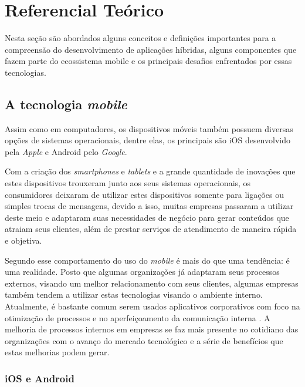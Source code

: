 \chapter{Referencial Teórico}
\label{cap2}

\vspace{-1.9cm}


    Nesta seção são abordados alguns conceitos e definições importantes para a compreensão do desenvolvimento de aplicações híbridas, alguns componentes que fazem parte do ecossistema mobile e os principais desafios enfrentados por essas tecnologias.
  
\section{A tecnologia \textit{mobile}}

    Assim como em computadores, os dispositivos móveis também possuem diversas opções de sistemas operacionais, dentre elas, os principais são iOS desenvolvido pela \textit{Apple} e Android pelo \textit{Google}. 

    Com a criação dos \textit{smartphones} e \textit{tablets} e a grande quantidade de inovações que estes dispositivos trouxeram junto aos seus sistemas operacionais, os consumidores deixaram de utilizar estes dispositivos somente para ligações ou simples trocas de mensagens, devido a isso, muitas empresas passaram a utilizar deste meio e adaptaram suas necessidades de negócio para gerar conteúdos que atraiam seus clientes, além de prestar serviços de atendimento de maneira rápida e objetiva.
    
    Segundo  esse comportamento do uso do \textit{mobile} é mais do que uma tendência: é uma realidade. Posto que algumas organizações já adaptaram seus processos externos, visando um melhor relacionamento com seus clientes, algumas empresas também tendem a utilizar estas tecnologias visando o ambiente interno. Atualmente, é bastante comum serem usados aplicativos corporativos com foco na otimização de processos e no aperfeiçoamento da comunicação interna \cite{Finzi2019}. A melhoria de processos internos em empresas se faz mais presente no cotidiano das organizações com o avanço do mercado tecnológico e a série de benefícios que estas melhorias podem gerar.

    \subsection{iOS e Android}
      \label{iOS&Android}
      
